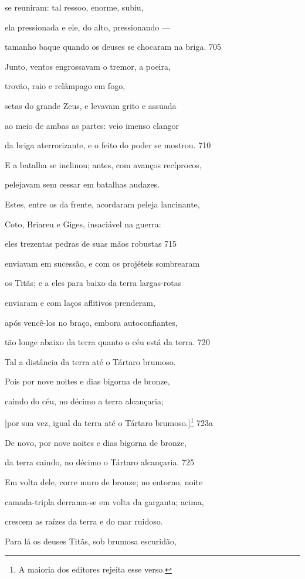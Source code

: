 se reuniram: tal ressoo, enorme, subiu,

ela pressionada e ele, do alto, pressionando ---

tamanho baque quando os deuses se chocaram na briga. \num{705}

Junto, ventos engrossavam o tremor, a poeira,

trovão, raio e relâmpago em fogo,

setas do grande Zeus, e levavam grito e assuada

ao meio de ambas as partes: veio imenso clangor

da briga aterrorizante, e o feito do poder se mostrou. \num{710}

\quad{}E a batalha se inclinou; antes, com avanços recíprocos,

pelejavam sem cessar em batalhas audazes.

Estes, entre os da frente, acordaram peleja lancinante,

Coto, Briareu e Giges, insaciável na guerra:

eles trezentas pedras de suas mãos robustas \num{715}

enviavam em sucessão, e com os projéteis sombrearam

os Titãs; e a eles para baixo da terra largas-rotas

enviaram e com laços aflitivos prenderam,

após vencê-los no braço, embora autoconfiantes,

tão longe abaixo da terra quanto o céu está da terra. \num{720}

\medskip

Tal a distância da terra até o Tártaro brumoso.

Pois por nove noites e dias bigorna de bronze,

caindo do céu, no décimo a terra alcançaria;

{[}por sua vez, igual da terra até o Tártaro brumoso.{]}\footnote{A maioria dos editores rejeita esse verso.} \num{723a}

De novo, por nove noites e dias bigorna de bronze,

da terra caindo, no décimo o Tártaro alcançaria. \num{725}

Em volta dele, corre muro de bronze; no entorno, noite

camada-tripla derrama-se em volta da garganta; acima,

crescem as raízes da terra e do mar ruidoso.

\quad{}Para lá os deuses Titãs, sob brumosa escuridão,

